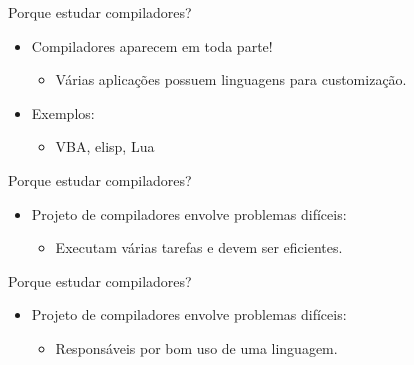 \begin{frame}{Porque estudar compiladores?}

    \begin{itemize}

        \item
        Compiladores aparecem em toda parte!

        \begin{itemize}

            \item
            Várias aplicações possuem linguagens para customização.
        \end{itemize}
        \item
        Exemplos:

        \begin{itemize}

            \item
            VBA, elisp, Lua
        \end{itemize}
    \end{itemize}
\end{frame}

\begin{frame}{Porque estudar compiladores?}

    \begin{itemize}

        \item
        Projeto de compiladores envolve problemas difíceis:

        \begin{itemize}

            \item
            Executam várias tarefas e devem ser eficientes.
        \end{itemize}
    \end{itemize}
\end{frame}

\begin{frame}{Porque estudar compiladores?}

    \begin{itemize}

        \item
        Projeto de compiladores envolve problemas difíceis:

        \begin{itemize}

            \item
            Responsáveis por bom uso de uma linguagem.
        \end{itemize}
    \end{itemize}
\end{frame}

